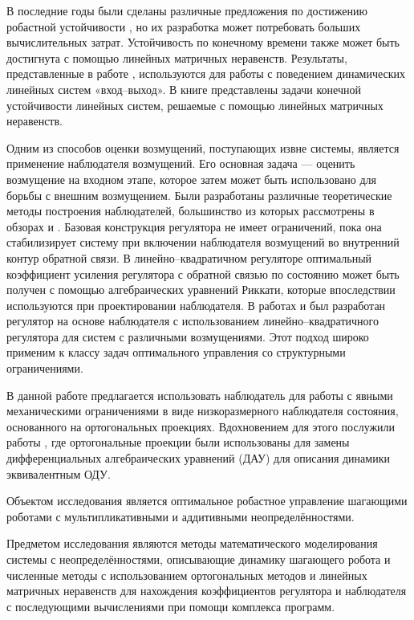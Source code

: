 В последние годы были сделаны различные предложения по достижению робастной устойчивости \cite{LMI7, LMI8}, но их разработка может потребовать больших вычислительных затрат.
Устойчивость по конечному времени также может быть достигнута с помощью линейных матричных неравенств. Результаты, представленные в работе \cite{LMI6}, используются для работы с поведением динамических линейных систем «вход--выход». В книге \cite{Amato2011} представлены задачи конечной устойчивости линейных систем, решаемые с помощью линейных матричных неравенств.

Одним из способов оценки возмущений, поступающих извне системы, является применение наблюдателя возмущений. Его основная задача --- оценить возмущение на входном этапе, которое затем может быть использовано для борьбы с внешним возмущением. Были разработаны различные теоретические методы построения наблюдателей, большинство из которых рассмотрены в обзорах \cite{ObserverITMO} и \cite{Disturb_obs}. Базовая конструкция регулятора не имеет ограничений, пока она стабилизирует систему при включении наблюдателя возмущений во внутренний контур обратной связи. В линейно--квадратичном регуляторе оптимальный коэффициент усиления регулятора с обратной связью по состоянию может быть получен с помощью алгебраических уравнений Риккати, которые впоследствии используются при проектировании наблюдателя. В работах \cite{LQR1} и \cite{LQR2} был разработан регулятор на основе наблюдателя с использованием линейно--квадратичного регулятора для систем с различными возмущениями. Этот подход широко применим к классу задач оптимального управления со структурными ограничениями. 

В данной работе предлагается использовать наблюдатель для работы с явными механическими ограничениями в виде низкоразмерного наблюдателя состояния, основанного на ортогональных проекциях. Вдохновением для этого послужили работы \cite{SAVIN2021, Righetti2011}, где ортогональные проекции были использованы для замены дифференциальных алгебраических уравнений (ДАУ) для описания динамики эквивалентным ОДУ. 

{\objectsubject} 

Объектом исследования является оптимальное робастное управление шагающими роботами с мультипликативными и аддитивными неопределённостями.

Предметом исследования являются методы математического моделирования системы с неопределённостями, описывающие динамику шагающего робота и численные методы с использованием ортогональных методов и линейных матричных неравенств для нахождения коэффициентов регулятора и наблюдателя с последующими вычислениями при помощи комплекса программ.

